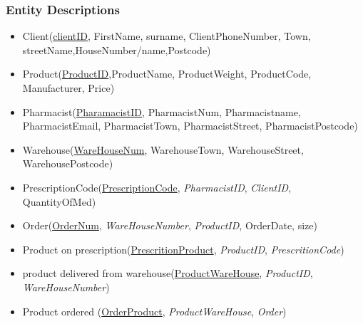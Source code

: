 \subsubsection{Entity Descriptions}
\begin{itemize}
\item Client(\underline{clientID}, FirstName, surname, ClientPhoneNumber, Town, streetName,HouseNumber/name,Postcode)
\item Product(\underline{ProductID},ProductName, ProductWeight, ProductCode, Manufacturer, Price)
\item Pharmacist(\underline{PharamacistID}, PharmacistNum, Pharmacistname,
PharmacistEmail, PharmacistTown, PharmacistStreet, PharmacistPostcode)
\item Warehouse(\underline{WareHouseNum}, WarehouseTown, WarehouseStreet, WarehousePostcode)
\item PrescriptionCode(\underline{PrescriptionCode}, \emph{PharmacistID}, \emph{ClientID}, QuantityOfMed)
\item Order(\underline{OrderNum}, \emph{WareHouseNumber}, \emph{ProductID}, OrderDate, size)
\item Product on prescription(\underline{PrescritionProduct}, \emph{ProductID}, \emph{PrescritionCode})
\item product delivered from warehouse(\underline{ProductWareHouse}, \emph{ProductID}, \emph{WareHouseNumber})
\item Product ordered (\underline{OrderProduct}, \emph{ProductWareHouse}, \emph{Order})


\end{itemize}
